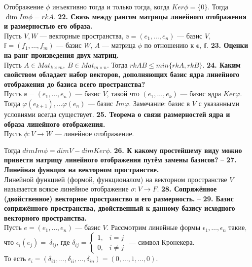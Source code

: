 \documentclass{article}
\begin{document}
Отображение $\phi$ инъективно тогда и только тогда, когда $Ker \phi = \{0\}$.
Тогда $\dim Im \phi = rk A$.
\newline
\newline
\textbf{22. Связь между рангом матрицы линейного отображения и размерностью его образа.}\\
Пусть $V, W$ --- векторные пространства, $\mathbb{e} = (e_1, \ldots, e_n)$ --- базис $V$, $\mathbb{f} = (f_1, \ldots, f_m)$ --- базис $W$, $A$ --- матрица $\phi$ по отношению к $\mathbb{e},\ \mathbb{f}$.
\newline
\newline
\textbf{23. Оценки на ранг произведения двух матриц.}\\
Пусть $A \in Mat_{k\times m},\ B\in Mat_{m\times n}$. Тогда $rk AB \leqslant min\{rk A, rk B\}$.
\newline
\newline
\textbf{24. Каким свойством обладает набор векторов, дополняющих базис ядра линейного отображения до базиса всего пространства?}\\
Пусть  $\mathbb{e} = (e_1, \ldots, e_n)$ --- базис $V$, такой что $(e_1, \ldots, e_k)$ --- базис ядра $Ker\varphi$. Тогда $\varphi(e_{k+1}),\ldots\varphi(e_n)$ --- базис $Im\varphi$. 
Замечание: базис в $V$ с указанными условиями всегда существует.
\newline
\newline
\textbf{25. Теорема о связи размерностей ядра и образа линейного отображения.}\\
Пусть $\phi\colon V \rightarrow W$ --- линейное отображение.

Тогда $dim Im \phi = dim V - dim Ker \phi$.
\newline
\newline
\textbf{26. К какому простейшему виду можно привести матрицу линейного отображения путём замены базисов?}
--
\newline
\newline
\textbf{27. Линейная функция на векторном пространстве.}\\
Линейной функцией (формой, функционалом) на векторном пространстве $V$ называется всякое линейное отображение $\sigma \colon V \rightarrow F$.
\newline
\newline
\textbf{28. Сопряжённое (двойственное) векторное пространство и его размерность.}
--
\newline
\newline
\textbf{29. Базис сопряжённого пространства, двойственный к данному базису исходного векторного пространства.}\\
Пусть $e = (e_1, \ldots, e_n)$ --- базис $V$. Рассмотрим линейные формы $\epsilon_1, \ldots, \epsilon_n$ такие, что $\epsilon_i(e_j) =~\delta_{ij}$, где $\delta_{ij} =
\begin{cases}
1, & i = j \\
0, & i \neq j
\end{cases}
$ --- символ Кронекера. \\То есть $\epsilon_i = (\delta_{i1}, \ldots, \delta_{ii}, \ldots, \delta_{in}) = (0, \ldots, 1, \ldots, 0)$.
\end{document}

